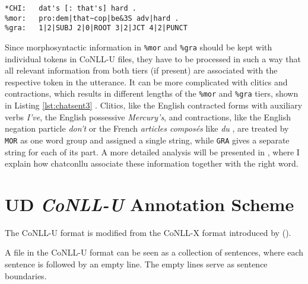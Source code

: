 \lstset{
numbers = none,
frame = single,
}

\begin{lstlisting}[caption={Example to show the different number of strings in \texttt{\%mor} and \texttt{\&gra} tiers due to contracted form \emph{that's}.}, label={lst:chatsent3}]
*CHI:   dat's [: that's] hard .
%mor:   pro:dem|that~cop|be&3S adv|hard .
%gra:   1|2|SUBJ 2|0|ROOT 3|2|JCT 4|2|PUNCT
\end{lstlisting}


Since morphosyntactic information in \texttt{\%mor} and \texttt{\%gra} should be kept with individual tokens in CoNLL-U files, they have to be processed in such a way that all relevant information from both tiers (if present) are associated with the respective token in the utterance. It can be more complicated with clitics and contractions, which results in different lengths of the \texttt{\%mor} and \texttt{\%gra} tiers, shown in Listing \ref{lst:chatsent3} . Clitics, like the English contracted forms with auxiliary verbs \emph{I've}, the English possessive \emph{Mercury's}, and contractions, like the English negation particle \emph{don't} or the French \emph{articles composés} like \emph{du} , are treated by \texttt{MOR} as one word group and assigned a single string, while \texttt{GRA} gives a separate string for each of its part. A more detailed analysis will be presented in , where I explain how chatconllu associate these information together with the right word.

\newcommand{\conllu}[1]{&\footnotesize\texttt{#1}}
\newcommand{\tab}{&\hspace{0.1em}}
\setlength{\abovedisplayskip}{3pt}
\setlength{\belowdisplayskip}{3pt}

\section{UD \emph{CoNLL-U} Annotation Scheme}

The CoNLL-U format is modified from the CoNLL-X format introduced by (\cite{buchholz-marsi-2006-conll}).

A file in the CoNLL-U format can be seen as a collection of sentences, where each sentence is followed by an empty line. The empty lines serve as sentence boundaries.

